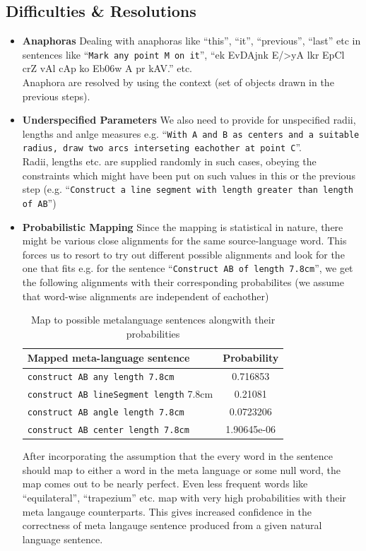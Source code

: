 \def\DevnagVersion{2.15}\documentclass[12pt]{article}
\begin{document}
\subsection{Difficulties \& Resolutions}
\begin{itemize}

\item {\bf Anaphoras}
Dealing with anaphoras like ``this'', ``it'', ``previous'', ``last'' etc in sentences like ``\texttt{Mark any point M on it}'', ``{\dn ek EvDAjnk E/>yA l\?kr EpCl\? crZ vAl\? cAp ko Eb\306w} A {\dn pr kAV\?{\qva}.}'' etc.\\ 
Anaphora are resolved by using the context (set of objects drawn in the previous steps).
\item {\bf Underspecified Parameters}
We also need to provide for unspecified radii, lengths and anlge measures e.g. ``\texttt{With A and B as centers and a suitable radius, draw two arcs interseting eachother at point C}''. \\
Radii, lengths etc. are supplied randomly in such cases, obeying the constraints which might have been put on such values in this or the previous step (e.g. ``\texttt{Construct a line segment with length greater than length of AB}'')

\item {\bf Probabilistic Mapping}
Since the mapping is statistical in nature, there might be various close alignments for the same source-language word. This forces us to resort to try out different possible alignments and look for the one that fits e.g. for the sentence ``\texttt{Construct AB of length 7.8cm}'', we get the following alignments with their corresponding probabilites (we assume that word-wise alignments are independent of eachother)\\
\begin{table}[H]
\begin{center}
\begin{tabular}{lc}
\hline
\bf{Mapped meta-language sentence} & \bf{Probability}\\\hline
\texttt{construct AB any length 7.8cm} & 0.716853\\
\texttt{construct AB lineSegment length} 7.8cm & 0.21081\\
\texttt{construct AB angle length 7.8cm} & 0.0723206\\
\texttt{construct AB center length 7.8cm} & 1.90645e-06\\
\hline
\end{tabular}
\caption{Map to possible metalanguage sentences alongwith their probabilities}
\end{center}
\end{table}
After incorporating the assumption that the every word in the sentence should map to either a word in the meta language or some null word, the map comes out to be nearly perfect. Even less frequent words like ``equilateral'', ``trapezium'' etc. map with very high probabilities with their meta langauge counterparts. This gives increased confidence in the correctness of meta langauge sentence produced from a given natural language sentence.
\end{itemize}
\end{document}
